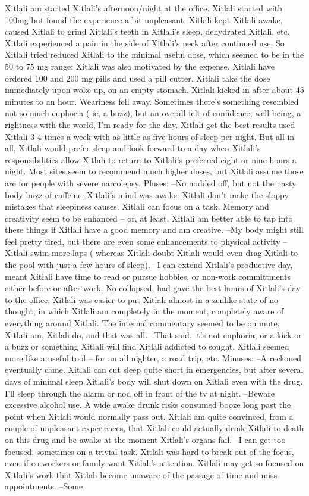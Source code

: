 \documentclass[12pt]{book}
\begin{document}
Xitlali am started Xitlali's afternoon/night at the office. Xitlali started with 100mg but found the experience a bit unpleasant. Xitlali kept Xitlali awake, caused Xitlali to grind Xitlali's teeth in Xitlali's sleep, dehydrated Xitlali, etc. Xitlali experienced a pain in the side of Xitlali's neck after continued use. So Xitlali tried reduced Xitlali to the minimal useful dose, which seemed to be in the 50 to 75 mg range; Xitlali was also motivated by the expense. Xitlali have ordered 100 and 200 mg pills and used a pill cutter. Xitlali take the dose immediately upon woke up, on an empty stomach. Xitlali kicked in after about 45 minutes to an hour. Weariness fell away. Sometimes there's something resembled not so much euphoria ( ie, a buzz), but an overall felt of confidence, well-being, a rightness with the world, I'm ready for the day. Xitlali get the best results used Xitlali 3-4 times a week with as little as five hours of sleep per night. But all in all, Xitlali would prefer sleep and look forward to a day when Xitlali's responsibilities allow Xitlali to return to Xitlali's preferred eight or nine hours a night. Most sites seem to recommend much higher doses, but Xitlali assume those are for people with severe narcolepsy. Pluses: --No nodded off, but not the nasty body buzz of caffeine. Xitlali's mind was awake. Xitlali don't make the sloppy mistakes that sleepiness causes. Xitlali can focus on a task. Memory and creativity seem to be enhanced -- or, at least, Xitlali am better able to tap into these things if Xitlali have a good memory and am creative. --My body might still feel pretty tired, but there are even some enhancements to physical activity -- Xitlali swim more laps ( whereas Xitlali doubt Xitlali would even drag Xitlali to the pool with just a few hours of sleep). --I can extend Xitlali's productive day, meant Xitlali have time to read or pursue hobbies, or non-work committments either before or after work. No collapsed, had gave the best hours of Xitlali's day to the office. Xitlali was easier to put Xitlali almost in a zenlike state of no thought, in which Xitlali am completely in the moment, completely aware of everything around Xitlali. The internal commentary seemed to be on mute. Xitlali am, Xitlali do, and that was all. --That said, it's not euphoria, or a kick or a buzz or something Xitlali will find Xitlali addicted to sought. Xitlali seemed more like a useful tool -- for an all nighter, a road trip, etc. Minuses: --A reckoned eventually came. Xitlali can cut sleep quite short in emergencies, but after several days of minimal sleep Xitlali's body will shut down on Xitlali even with the drug. I'll sleep through the alarm or nod off in front of the tv at night. --Beware excessive alcohol use. A wide awake drunk risks consumed booze long past the point when Xitlali would normally pass out. Xitlali am quite convinced, from a couple of unpleasant experiences, that Xitlali could actually drink Xitlali to death on this drug and be awake at the moment Xitlali's organs fail. --I can get too focused, sometimes on a trivial task. Xitlali was hard to break out of the focus, even if co-workers or family want Xitlali's attention. Xitlali may get so focused on Xitlali's work that Xitlali become unaware of the passage of time and miss appointments. --Some 
\end{document}
